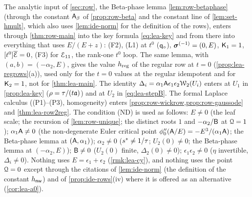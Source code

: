 \begin{rmk}
\label{rmk:lea-inputs}
The analytic input of \cref{sec:row}, the Beta-phase lemma \cref{lem:row-betaphase} (through the constant $\mathsf{A}_{\beta}$ of \cref{prop:row-beta} and the constant line of \cref{lem:set-hmult}, which also uses \cref{lem:ide-norm} for the definition of the rows), enters through \cref{thm:row-main} into the key formula \eqref{eq:lea-key} and from there into everything that uses $E/(E+z)$: (F2), (L1) at $t^0$ ($\mathsf{q}_{\circ}$), $\boldsymbol{\sigma}^{(-1)} = (0,E)$, $\mathsf{K}_{1} = 1$, $[t^0]\overline{\mathcal{E}} = 0$, (F3) for $\mathcal{E}_{11}$, the rank-one $t^0$ loop. The same lemma, with $(a,b) = (-\alpha_2,E)$, gives the value $h_{\mathrm{reg}}$ of the regular row at $t = 0$ (\cref{prop:lea-regrows}(a)), used only for the $t = 0$ values at the regular idempotent and for $\mathsf{K}_{2} = 1$, not for \cref{thm:lea-main}. The identity $\Delta_i = \alpha_1\mathsf{A}\epsilon_1\epsilon_2\mathcal{W}_2(U_i)$ enters at $U_1$ in \cref{prop:lea-key} ($\rho = \tau/(t\mathfrak{a})$) and at $U_2$ in \eqref{eq:lea-stepB}. The formal Laplace calculus ((P1)--(P3), homogeneity) enters \cref{prop:row-wickrow,prop:row-gaussode} and \cref{thm:lea-row2reg}. The condition (ND) is used as follows: $E\neq 0$ (the leaf scale; the recursion of \cref{lem:row-unique}; the distinct roots $1$ and $-\alpha_2/\mathsf{B}$ at $\mathcal{Q} = 1$); $\alpha_1\mathsf{A}\neq 0$ (the non-degenerate Euler critical point $\phi_0''(\mathsf{A}/E) = -E^3/(\alpha_1\mathsf{A})$; the Beta-phase lemma at $(\mathsf{A},\alpha_1)$); $\alpha_2\neq 0$ ($s^{\ast}\neq 1/\tau$; $U_2(0)\neq 0$; the Beta-phase lemma at $(-\alpha_2,E)$); $\mathsf{B}\neq 0$ ($U_2(0)$ finite, $\Delta_2(0)\neq 0$); $\epsilon_1\epsilon_2\neq 0$ ($\eta$ invertible, $\Delta_i\neq 0$). Nothing uses $E = \epsilon_1+\epsilon_2$ (\cref{rmk:lea-cy}), and nothing uses the point $\mathcal{Q} = 0$ except through the citations of \cref{lem:ide-norm} (the definition of the constant $h_{\mathsf{nw}}$) and of \cref{prop:ide-rows}(iv) where it is offered as an alternative (\cref{cor:lea-a0}).
\end{rmk}


